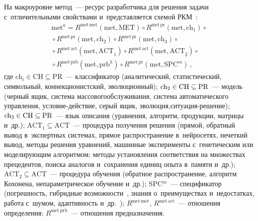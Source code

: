 \begin{multicols}{2}
  На макроуровне метод~--- ресурс разработчика для решения задачи с~отличительными 
свойствами и~представляется схемой РКМ~\cite{11-kir, 17-kir}:
\begin{multline*}
\mathrm{met}^a=R^{\mathrm{met\,met}}(\mathrm{met, MET}) \circ R^{\mathrm{met\,pr}} 
(\mathrm{met}, \mathrm{ch}_1) \circ{}\\
{}\circ
R^{\mathrm{met\,pr}}(\mathrm{met}, \mathrm{ch}_2) 
\circ R^{\mathrm{met\,pr}}(\mathrm{met},\mathrm{ch}_3)\circ{}\\
{}\circ 
R^{\mathrm{met\,act}} (\mathrm{met, ACT}_1) 
\circ
R^{\mathrm{met\,act}} (\mathrm{met, ACT}_2) \circ{}\\
{}\circ
R^{\mathrm{met\,prb}} (\mathrm{met, prb}^h) \circ
R^{\mathrm{met\,pr}} (\mathrm{met, SPC}^m)\,,
\end{multline*}
где $\mathrm{ch}_i\in \mathrm{CH}\subseteq \mathrm{PR}$~--- 
классификатор (аналитический, статистический, символьный, 
коннекционистский, эволюционный); $\mathrm{ch}_2\hm\in \mathrm{CH}\hm\subseteq
\mathrm{PR}$~--- модель (черный ящик, сис\-те\-ма 
массового\linebreak \mbox{обслуживания}, система автоматического управ\-ле\-ния, 
усло\-вие-дей\-ст\-вие, серый 
ящик, эволюция,\linebreak си\-ту\-а\-ция-ре\-ше\-ние); $\mathrm{ch}_3\hm\in \mathrm{CH}\hm
\subseteq \mathrm{PR}$~--- язык описания (уравнения, алгоритм, 
продукции, матрицы и~др.); $\mathrm{ACT}_1\subseteq \mathrm{ACT}$~--- процедура 
получения решения (прямой, обратный вывод в~экспертных системах, прямое 
распространение в~нейросетях,\linebreak
 нечеткий вывод, методы решения уравнений, машинные 
эксперименты с~генетическим или моделирующим алгоритмом; методы установления 
соответствия на множествах прецедентов, поиска\linebreak
 аналогов и~сохранения единиц опыта 
в~памяти и~др.);  $\mathrm{ACT}_2\subseteq \mathrm{ACT}$~--- процедура обучения 
(обратное 
распространение, алгоритм Кохонена, не\-па\-ра\-мет\-ри\-че\-ское обучение и~др.);   
SPC$^m$~--- 
спецификатор (погрешность, гибридные возможности~\cite{11-kir, 17-kir}, знания 
о~преимуществах и~недостатках, работа с~шумом, адаптивность и~др.~\cite{11-kir, 17-kir});
$R^{\mathrm{met\,met}}$, $R^{\mathrm{met\,act}}$~--- отношения определения;   
$R^{\mathrm{met\,prb}}$~--- отношения предназначения. 
  

\end{multicols}
